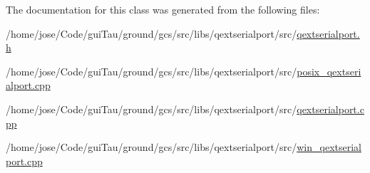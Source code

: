 The documentation for this class was generated from the following files\-:\begin{DoxyCompactItemize}
\item 
/home/jose/\-Code/gui\-Tau/ground/gcs/src/libs/qextserialport/src/\hyperlink{qextserialport_8h}{qextserialport.\-h}\item 
/home/jose/\-Code/gui\-Tau/ground/gcs/src/libs/qextserialport/src/\hyperlink{posix__qextserialport_8cpp}{posix\-\_\-qextserialport.\-cpp}\item 
/home/jose/\-Code/gui\-Tau/ground/gcs/src/libs/qextserialport/src/\hyperlink{qextserialport_8cpp}{qextserialport.\-cpp}\item 
/home/jose/\-Code/gui\-Tau/ground/gcs/src/libs/qextserialport/src/\hyperlink{win__qextserialport_8cpp}{win\-\_\-qextserialport.\-cpp}\end{DoxyCompactItemize}
